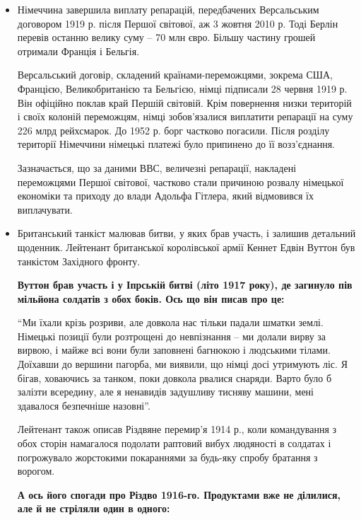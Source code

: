 \begin{itemize}
	
\item  Німеччина завершила виплату репарацій, передбачених Версальським
договором 1919 р. після Першої світової, аж 3 жовтня 2010 р. Тоді
Берлін перевів останню велику суму – 70 млн євро. Більшу частину
грошей отримали Франція і Бельгія.

Версальський договір, складений країнами-переможцями, зокрема США,
Францією, Великобританією та Бельгією, німці підписали 28 червня 1919 р.
Він офіційно поклав край Першій світовій. Крім повернення низки територій
і своїх колоній переможцям, німці зобов'язалися виплатити репарації на
суму 226 млрд рейхсмарок. До 1952 р. борг частково погасили. Після розділу
території Німеччини німецькі платежі було припинено до її возз'єднання.

Зазначається, що за даними ВВС, величезні репарації, накладені переможцями
Першої світової, частково стали причиною розвалу німецької економіки та
приходу до влади Адольфа Гітлера, який відмовився їх виплачувати.

\item  Британський танкіст малював битви, у яких брав участь, і залишив
детальний щоденник. Лейтенант британської королівської армії Кеннет
Едвін Вуттон був танкістом Західного фронту.

\begin{leftbar}
	\bfseries
Вуттон брав участь і у Іпрській битві (літо 1917 року), де загинуло пів
мільйона солдатів з обох боків. Ось що він писав про це:
\end{leftbar}

\enquote{Ми їхали крізь розриви, але довкола нас тільки падали шматки землі.
Німецькі позиції були розтрощені до невпізнання – ми долали вирву за
вирвою, і майже всі вони були заповнені багнюкою і людськими тілами.
Доїхавши до вершини пагорба, ми виявили, що німці досі утримують ліс. Я
бігав, ховаючись за танком, поки довкола рвалися снаряди. Варто було б
залізти всередину, але я ненавидів задушливу тисняву машини, мені
здавалося безпечніше назовні}.

Лейтенант також описав Різдвяне перемир'я 1914 р., коли командування з
обох сторін намагалося подолати раптовий вибух людяності в солдатах і
погрожувало жорстокими покараннями за будь-яку спробу братання з ворогом.

\begin{leftbar}
	\bfseries
А ось його спогади про Різдво 1916-го. Продуктами вже не ділилися, але й
не стріляли один в одного:
\end{leftbar}


\end{itemize}
